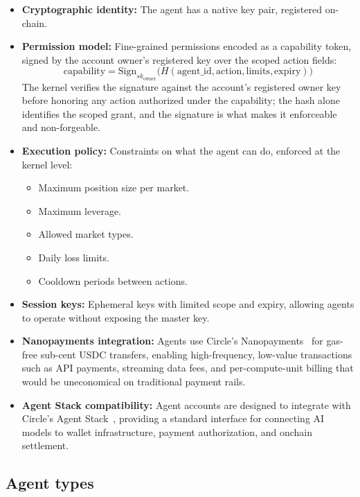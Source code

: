 \documentclass[11pt,a4paper]{article}
\begin{document}
\begin{itemize}
  \item \textbf{Cryptographic identity:} The agent has a native key pair, registered on-chain.
  \item \textbf{Permission model:} Fine-grained permissions encoded as a capability token, signed by the account owner's registered key over the scoped action fields:
  \[
  \text{capability} = \text{Sign}_{sk_{\text{owner}}}\big(H(\text{agent\_id}, \text{action}, \text{limits}, \text{expiry})\big)
  \]
  The kernel verifies the signature against the account's registered owner key before honoring any action authorized under the capability; the hash alone identifies the scoped grant, and the signature is what makes it enforceable and non-forgeable.
  \item \textbf{Execution policy:} Constraints on what the agent can do, enforced at the kernel level:
  \begin{itemize}
    \item Maximum position size per market.
    \item Maximum leverage.
    \item Allowed market types.
    \item Daily loss limits.
    \item Cooldown periods between actions.
  \end{itemize}
  \item \textbf{Session keys:} Ephemeral keys with limited scope and expiry, allowing agents to operate without exposing the master key.
  \item \textbf{Nanopayments integration:} Agents use Circle's Nanopayments~\cite{circle_nanopayments} for gas-free sub-cent USDC transfers, enabling high-frequency, low-value transactions such as API payments, streaming data fees, and per-compute-unit billing that would be uneconomical on traditional payment rails.
  \item \textbf{Agent Stack compatibility:} Agent accounts are designed to integrate with Circle's Agent Stack~\cite{circle_agent_stack}, providing a standard interface for connecting AI models to wallet infrastructure, payment authorization, and onchain settlement.
\end{itemize}

\subsection{Agent types}
\end{document}
